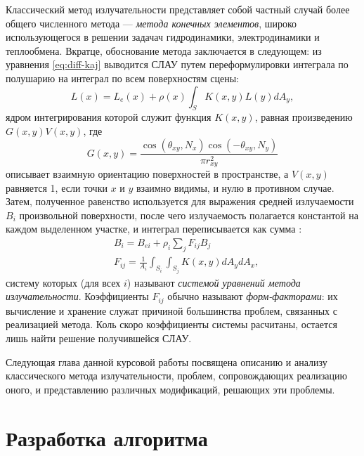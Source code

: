 \documentclass[12pt]{article}
\begin{document}
Классический метод излучательности представляет собой частный случай более общего численного метода --- \emph{метода конечных элементов}, широко использующегося в решении задачач гидродинамики, электродинамики и теплообмена. Вкратце, обоснование метода заключается в следующем: из уравнения \eqref{eq:diff-kaj} выводится СЛАУ путем переформулировки интеграла по полушарию на интеграл по всем поверхностям сцены:
\begin{equation}
L(x) = L_e(x) + \rho(x) \int_S K(x, y) L(y) d A_y, \label{eq:kaj-surf}
\end{equation}
ядром интегрирования которой служит функция $K(x,y)$, равная произведению $G(x,y) V(x,y)$, где 
\begin{equation}
G(x,y) = \frac{\cos(\theta_{xy}, N_x) \cos(-\theta_{xy}, N_y)}{\pi r_{xy}^2}\label{eq:geom}
\end{equation}
описывает взаимную ориентацию поверхностей в пространстве, а $V(x,y)$ равняется 1, если точки $x$ и $y$ взаимно видимы, и нулю в противном случае. Затем, полученное равенство используется для выражения средней излучаемости $B_i$ произвольной поверхности, после чего излучаемость полагается константой на каждом выделенном участке, и интеграл переписывается как сумма \cite{Coh93}:
\begin{equation}
\begin{split}
&B_i = B_{ei} + \rho_i \sum_j F_{ij} B_j\\
&F_{ij} = \frac{1}{A_i} \int_{S_i} \int_{S_j} K(x,y) dA_y dA_x, \label{eq:rad}
\end{split}
\end{equation}
систему которых (для всех $i$) называют \emph{системой уравнений метода излучательности}. Коэффициенты $F_{ij}$ обычно называют \emph{форм-факторами}: их вычисление и хранение служат причиной большинства проблем, связанных с реализацией метода. Коль скоро коэффициенты системы расчитаны, остается лишь найти решение получившейся СЛАУ.

Следующая глава данной курсовой работы посвящена описанию и анализу классического метода излучательности, проблем, сопровождающих реализацию оного, и представлению различных модификаций, решающих эти проблемы.
\newpage\section{Разработка алгоритма}
\end{document}
